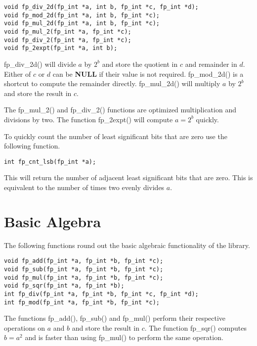 \documentclass[b5paper]{book}
\begin{document}
    
\begin{verbatim}
void fp_div_2d(fp_int *a, int b, fp_int *c, fp_int *d);
void fp_mod_2d(fp_int *a, int b, fp_int *c);
void fp_mul_2d(fp_int *a, int b, fp_int *c);
void fp_mul_2(fp_int *a, fp_int *c);
void fp_div_2(fp_int *a, fp_int *c);
void fp_2expt(fp_int *a, int b);
\end{verbatim}
fp\_div\_2d() will divide $a$ by $2^b$ and store the quotient in $c$ and remainder in $d$.  Either of 
$c$ or $d$ can be \textbf{NULL} if their value is not required.  fp\_mod\_2d() is a shortcut to 
compute the remainder directly.  fp\_mul\_2d() will multiply $a$ by $2^b$ and store the result in $c$.  

The fp\_mul\_2() and fp\_div\_2() functions are optimized multiplication and divisions by two.  The 
function fp\_2expt() will compute $a = 2^b$ quickly.

To quickly count the number of least significant bits that are zero use the following function.

\begin{verbatim}
int fp_cnt_lsb(fp_int *a);
\end{verbatim}
This will return the number of adjacent least significant bits that are zero.  This is equivalent 
to the number of times two evenly divides $a$.

\section{Basic Algebra}

The following functions round out the basic algebraic functionality of the library.

     
\begin{verbatim}
void fp_add(fp_int *a, fp_int *b, fp_int *c);
void fp_sub(fp_int *a, fp_int *b, fp_int *c);
void fp_mul(fp_int *a, fp_int *b, fp_int *c);
void fp_sqr(fp_int *a, fp_int *b);
int fp_div(fp_int *a, fp_int *b, fp_int *c, fp_int *d);
int fp_mod(fp_int *a, fp_int *b, fp_int *c);
\end{verbatim}

The functions fp\_add(), fp\_sub() and fp\_mul() perform their respective operations on $a$ and
$b$ and store the result in $c$.  The function fp\_sqr() computes $b = a^2$ and is faster than
using fp\_mul() to perform the same operation.
\end{document}
